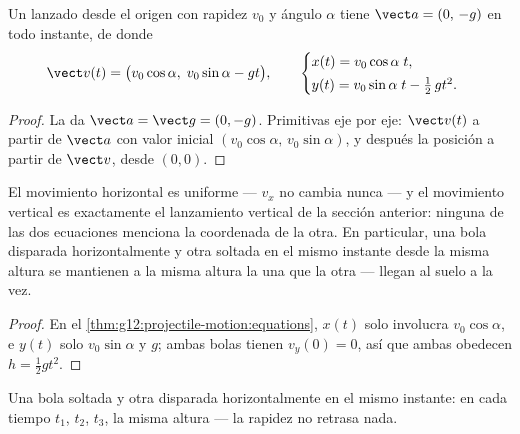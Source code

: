 \begin{theorem}\label{thm:g12:projectile-motion:equations}
Un  lanzado desde el origen con rapidez $v_0$ y ángulo $\alpha$ tiene
$\vect a = (0,\,-g)$ en todo instante, de donde
\[
\vect v(t) = \bigl(v_0\cos\alpha,\; v_0\sin\alpha - g t\bigr),
\qquad
\begin{cases}
x(t) = v_0\cos\alpha\; t,\\[2pt]
y(t) = v_0\sin\alpha\; t - \tfrac12\, g t^2 .
\end{cases}
\]
\end{theorem}

\begin{proof}
La  da $\vect a = \vect g = (0,-g)$. Primitivas eje por eje:
$\vect v(t)$ a partir de $\vect a$ con valor inicial
$(v_0\cos\alpha,\, v_0\sin\alpha)$, y después la posición a partir de $\vect v$, desde
$(0,0)$.
\end{proof}

\begin{proposition}\label{prop:g12:projectile-motion:independence}
El movimiento horizontal es uniforme --- $v_x$ no cambia nunca --- y el movimiento
vertical es exactamente el lanzamiento vertical de la sección anterior: ninguna de las
dos ecuaciones menciona la coordenada de la otra. En particular, una bola disparada
horizontalmente y otra soltada en el mismo instante desde la misma altura se mantienen
a la misma altura la una que la otra --- llegan al suelo a la vez.
\end{proposition}

\begin{proof}
En el \cref{thm:g12:projectile-motion:equations}, $x(t)$ solo involucra
$v_0\cos\alpha$, e $y(t)$ solo $v_0\sin\alpha$ y $g$; ambas bolas tienen
$v_y(0) = 0$, así que ambas obedecen $h = \tfrac12 gt^2$.
\end{proof}

\begin{omfigure}

{\small Una bola soltada y otra disparada horizontalmente en el mismo instante: en
cada tiempo $t_1$, $t_2$, $t_3$, la misma altura --- la rapidez no retrasa nada.}
\end{omfigure}

